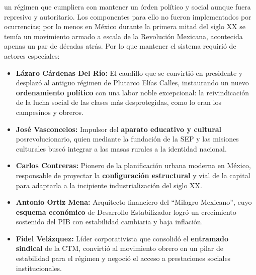 un régimen que cumpliera con mantener un órden político y social aunque fuera represivo y autoritario. 
Los componentes para ello no fueron implementados por ocurrencias; por lo menos en México durante la primera mitad del
siglo XX se temía un movimiento armado a escala de la Revolución Mexicana, acontecida apenas un par de décadas atrás.
Por lo que mantener el sistema requirió de actores especiales:
\begin{itemize}
    \item \textbf{Lázaro Cárdenas Del Río:} El caudillo que se convirtió en presidente y desplazó al antiguo régimen de
          Plutarco Elías Calles, instaurando un nuevo \textbf{ordenamiento político} con una labor noble excepcional: la reivindicación
          de la lucha social de las clases más desprotegidas, como lo eran los campesinos y obreros.

    \item \textbf{José Vasconcelos:} Impulsor del \textbf{aparato educativo y cultural} posrevolucionario, quien mediante la fundación de la SEP y
          las misiones culturales buscó integrar a las masas rurales a la identidad nacional.

    \item \textbf{Carlos Contreras:} Pionero de la planificación urbana moderna en México, responsable de proyectar la
          \textbf{configuración estructural} y vial de la capital para adaptarla a la incipiente industrialización del siglo XX.

    \item \textbf{Antonio Ortiz Mena:} Arquitecto financiero del ``Milagro Mexicano'', cuyo \textbf{esquema económico} de Desarrollo
          Estabilizador logró un crecimiento sostenido del PIB con estabilidad cambiaria y baja inflación.

    \item \textbf{Fidel Velázquez:} Líder corporativista que consolidó el \textbf{entramado sindical} de la CTM, convirtió
          al movimiento obrero en un pilar de estabilidad para el régimen y negoció el acceso a prestaciones sociales institucionales.


\end{itemize}
